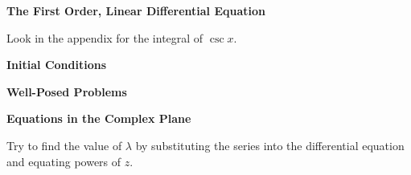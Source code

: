 {%
\begin{large}
  \noindent
  \textbf{The First Order, Linear Differential Equation}
\end{large}



\begin{Hint}
  \label{hint y + y / sin x}
  Look in the appendix for the integral of $\csc x$.
\end{Hint}




\begin{large}
  \noindent
  \textbf{Initial Conditions}
\end{large}





\begin{large}
  \noindent
  \textbf{Well-Posed Problems}
\end{large}




\begin{Hint}
  \label{hint t dydt + A y}
\end{Hint}







\begin{large}
  \noindent
  \textbf{Equations in the Complex Plane}
\end{large}



\begin{Hint}
  \label{hint dwdz + sin z z w}
\end{Hint}



\begin{Hint}
  \label{hint dwdz z-2 w}
  Try to find the value of $\lambda$ by substituting the series into the 
  differential equation and equating powers of $z$.
\end{Hint}


















\raggedbottom
}
\pagebreak
\flushbottom
